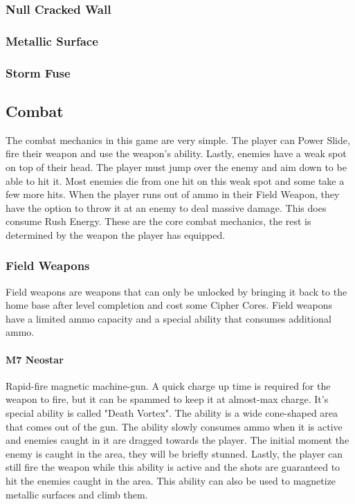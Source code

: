 \documentclass[12pt]{article}
\begin{document}
\subsubsection{Null Cracked Wall}

\subsubsection{Metallic Surface}

\subsubsection{Storm Fuse}

\subsection{Combat}

The combat mechanics in this game are very simple. The player can Power Slide, fire their weapon and use the weapon's ability. Lastly, enemies have a weak spot on top of their head. The player must jump over the enemy and aim down to be able to hit it. Most enemies die from one hit on this weak spot and some take a few more hits. When the player runs out of ammo in their Field Weapon, they have the option to throw it at an enemy to deal massive damage. This does consume Rush Energy.
These are the core combat mechanics, the rest is determined by the weapon the player has equipped.

\subsubsection{Field Weapons}

Field weapons are weapons that can only be unlocked by bringing it back to the home base after level completion and cost some Cipher Cores. Field weapons have a limited ammo capacity and a special ability that consumes additional ammo. 

\paragraph{M7 Neostar}

Rapid-fire magnetic machine-gun. A quick charge up time is required for the weapon to fire, but it can be spammed to keep it at almost-max charge. It's special ability is called "Death Vortex". The ability is a wide cone-shaped area that comes out of the gun. The ability slowly consumes ammo when it is active and enemies caught in it are dragged towards the player. The initial moment the enemy is caught in the area, they will be briefly stunned. Lastly, the player can still fire the weapon while this ability is active and the shots are guaranteed to hit the enemies caught in the area. This ability can also be used to magnetize metallic surfaces and climb them. 
\end{document}
